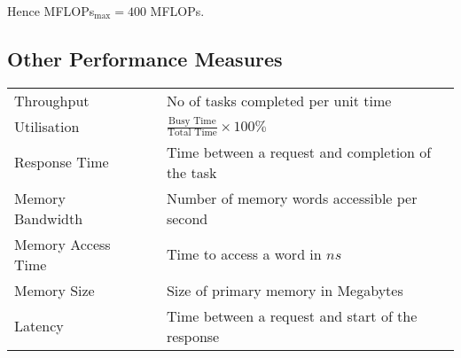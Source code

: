 \documentclass[a4paper,12pt]{article}
\begin{document}
Hence MFLOPs$_{\mbox{max}} = 400$ MFLOPs.

\subsection*{Other Performance Measures}

\begin{tabularx}{\linewidth}{llX}
Throughput	&	&	No of tasks completed per unit time									\\
Utilisation	&	&	$\frac{\mbox{Busy Time}}{\mbox{Total Time}} \times 100 \%$	\\
Response Time	&	&	Time between a request and completion of the task			\\
Memory Bandwidth	&	&	Number of memory words accessible per second				\\
Memory Access Time	&	&	Time to access a word in $ns$								\\
Memory Size		&	&	Size of primary memory in Megabytes								\\
Latency			&	&	Time between a request and start of the response			\\
\end{tabularx}
\end{document}
